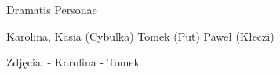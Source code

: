 Dramatis Personae

Karolina,
Kasia (Cybulka)
Tomek (Put)
Paweł (Kłeczi)

Zdjęcia:
- Karolina
- Tomek

